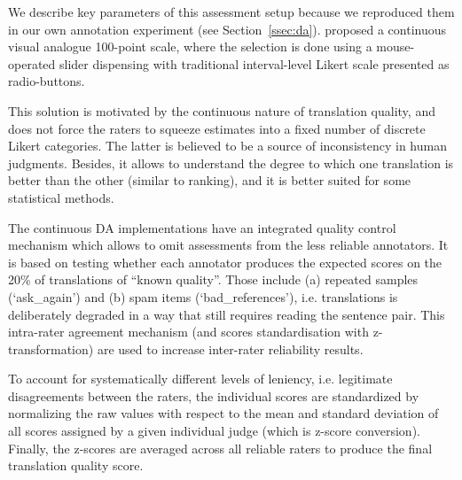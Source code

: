 We describe key parameters of this assessment setup because we reproduced them in our own annotation experiment (see Section~\ref{ssec:da}). 
\citet{Graham2013} proposed a continuous visual analogue 100-point scale, where the selection is done using a mouse-operated slider dispensing with traditional interval-level Likert scale presented as radio-buttons. 

This solution is motivated by the continuous nature of translation quality, and does not force the raters to squeeze estimates into a fixed number of discrete Likert categories. The latter is believed to be a source of inconsistency in human judgments. 
Besides, it allows to understand the degree to which one translation is better than the other (similar to ranking), and it is better suited for some statistical methods. 

The continuous DA implementations have an integrated quality control mechanism which allows to omit assessments from the less reliable annotators. It is based on testing whether each annotator produces the expected scores on the 20\% of translations of ``known quality''. Those include (a) repeated samples (`ask\_again') and (b) spam items (`bad\_references'), i.e. translations is deliberately degraded in a way that still requires reading the sentence pair. This intra-rater agreement mechanism (and scores standardisation with z-transformation) are used to increase inter-rater reliability results.

To account for systematically different levels of leniency, i.e. legitimate disagreements between the raters, the individual scores are standardized by normalizing the raw values with respect to the mean and standard deviation of all scores assigned by a given individual judge (which is z-score conversion). Finally, the z-scores are averaged across all reliable raters to produce the final translation quality score.   

